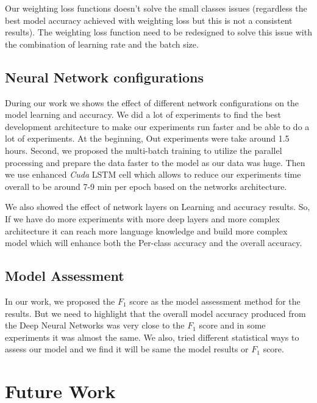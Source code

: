 Our weighting loss functions doesn't solve the small classes issues (regardless the best model accuracy achieved with weighting loss but this is not a consistent results). The weighting loss function need to be redesigned to solve this issue with the combination of learning rate and the batch size.


\subsection{Neural Network configurations}

During our work we shows the effect of different network configurations on the model learning and accuracy. We did a lot of experiments to find the best development architecture to make our experiments run faster and be able to do a lot of experiments. At the beginning, Out experiments were take around 1.5 hours. Second, we proposed the multi-batch training to utilize the parallel processing and prepare the data faster to the model as our data was huge. Then we use enhanced \textit{Cuda} LSTM cell which allows to reduce our experiments time overall to be around 7-9 min per epoch based on the networks architecture. 

We also showed the effect of network layers on Learning and accuracy results. So, If we have do more experiments with more deep layers and more complex architecture it can reach more language knowledge and build more complex model which will enhance both the Per-class accuracy and the overall accuracy.

\subsection{Model Assessment}

In our work, we proposed the $F_1$ score as the model assessment method for the results. But we need to highlight that the overall model accuracy produced from the Deep Neural Networks was very close to the $F_1$ score and in some experiments it was almost the same. We also, tried different statistical ways to assess our model and we find it will be same the model results or $F_1$ score.

  \section{Future Work}








